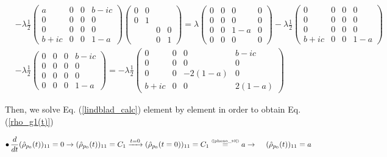 \documentclass[11pt]{article}
\numberwithin{equation}{section} %
\numberwithin{figure}{section} %
\newcommand\numeq[1] %
  {\stackrel{\scriptscriptstyle(\mkern-1.5mu#1\mkern-1.5mu)}{=}}
\begin{document}
\begin{appendices}
\begin{equation}
\begin{split}
&-\lambda\frac{1}{2}\begin{pmatrix}a&0&0&b-ic\\0&0&0&0\\0&0&0&0\\b+ic&0&0&1-a\end{pmatrix}\begin{pmatrix}0&0&&\\0&1&&\\&&0&0\\&&0&1\end{pmatrix}=\lambda\begin{pmatrix}0&0&0&0\\0&0&0&0\\0&0&1-a&0\\0&0&0&0\end{pmatrix}-\lambda\frac{1}{2}\begin{pmatrix}0&0&0&0\\0&0&0&0\\0&0&0&0\\b+ic&0&0&1-a\end{pmatrix}\\
&-\lambda\frac{1}{2}\begin{pmatrix}0&0&0&b-ic\\0&0&0&0\\0&0&0&0\\0&0&0&1-a\end{pmatrix}=-\lambda\frac{1}{2}\begin{pmatrix}0&0&0&b-ic\\0&0&0&0\\0&0&-2(1-a)&0\\b+ic&0&0&2(1-a)\end{pmatrix}
\end{split}
\end{equation}

Then, we solve Eq. (\ref{lindblad_calc}) element by element in order to obtain Eq. (\ref{rho_g1(t)})

\begin{equation} \label{rho_11}
\bullet\,\frac{d}{dt}(\hat{\rho}_{p_0}(t))_{11}=0\rightarrow(\hat{\rho}_{p_0}(t))_{11}=C_1 \xrightarrow{t=0} (\hat{\rho}_{p_0}(t=0))_{11}=C_1\numeq{\textrm{\ref{pheno_t0}}}a\rightarrow\,\,\,\,\,\,\,(\hat{\rho}_{p_0}(t))_{11}=a
\end{equation}


\end{appendices}
\end{document}
